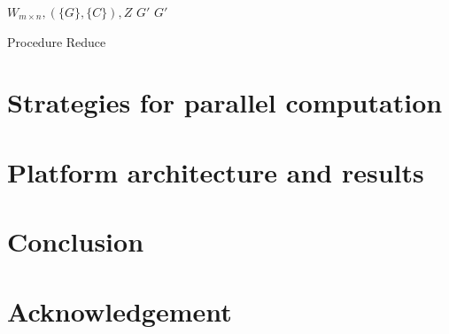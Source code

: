 \documentclass[a4paper,conference]{IEEEtran}
\begin{document}
\begin{algorithm}
\begin{algorithmic}[1]
\REQUIRE $W_{m\times n}, (\{G\}, \{C\}), Z$
\ENSURE $G'$
\ENDIF
\ENDFOR
\RETURN $G'$
\caption{Procedure Reduce}\label{alg:Reduce}
\end{algorithmic}
\end{algorithm}

\section{Strategies for parallel computation}

\section{Platform architecture and results}

\section{Conclusion}

\section{Acknowledgement}




\balance 
\end{document}
